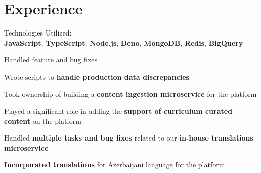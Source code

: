 \documentclass[]{deedy-resume-openfont}
\begin{document}
\begin{minipage}[t]{0.33\textwidth}

%
%

\end{minipage} 
\hfill
\begin{minipage}[t]{0.66\textwidth} 


\section{Experience}

\sectionsep
\begin{tightemize}
\item Technologies Utilized: \\\textbf{JavaScript}, \textbf{TypeScript}, \textbf{Node.js}, \textbf{Deno}, \textbf{MongoDB}, \textbf{Redis}, \textbf{BigQuery}
\item Handled feature and bug fixes
\item Wrote scripts to \textbf{handle production data discrepancies}
\item Took ownership of building a \textbf{content ingestion microservice} for the platform
\item Played a significant role in adding the \textbf{support of curriculum curated content} on the platform
\item Handled \textbf{multiple tasks and bug fixes} related to our \textbf{in-house translations microservice}
\item \textbf{Incorporated translations} for Azerbaijani language for the platform
\end{tightemize}


\end{minipage}
\end{document}
